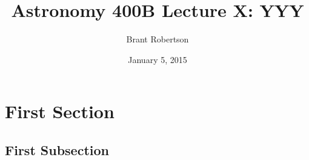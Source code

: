 \documentclass[]{article}
\title{Astronomy 400B Lecture X: YYY}
\author{Brant Robertson}
\date{January 5, 2015}
\begin{document}
\maketitle

\section{First Section}

\subsection{First Subsection}
\end{document}
